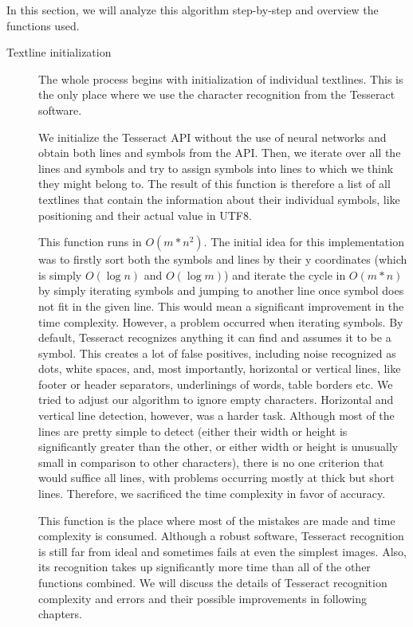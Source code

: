 In this section, we will analyze this algorithm step-by-step and overview the functions used.

\begin{description}
\item[Textline initialization] The whole process begins with initialization of individual textlines. This is the only place where we use the character recognition from the Tesseract software.

We initialize the Tesseract API without the use of neural networks and obtain both lines and symbols from the API. Then, we iterate over all the lines and symbols and try to assign symbols into lines to which we think they might belong to. The result of this function is therefore a list of all textlines that contain the information about their individual symbols, like positioning and their actual value in UTF8.

This function runs in $O(m*n^2)$. The initial idea for this implementation was to firstly sort both the symbols and lines by their y coordinates (which is simply $O(\log n)$ and  $O(\log m)$) and iterate the cycle in $O(m*n)$ by simply iterating symbols and jumping to another line once symbol does not fit in the given line. This would mean a significant improvement in the time complexity. However, a problem occurred when iterating symbols. By default, Tesseract recognizes anything it can find and assumes it to be a symbol. This creates a lot of false positives, including noise recognized as dots, white spaces, and, most importantly, horizontal or vertical lines, like footer or header separators, underlinings of words, table borders etc. We tried to adjust our algorithm to ignore empty characters. Horizontal and vertical line detection, however, was a harder task. Although most of the lines are pretty simple to detect (either their width or height is significantly greater than the other, or either width or height is unusually small in comparison to other characters), there is no one criterion that would suffice all lines, with problems occurring mostly at thick but short lines. Therefore, we sacrificed  the time complexity in favor of accuracy.

This function is the place where most of the mistakes are made and time complexity is consumed. Although a robust software, Tesseract recognition is still far from ideal and sometimes fails at even the simplest images. Also, its recognition takes up significantly more time than all of the other functions combined. We will discuss the details of Tesseract recognition complexity and errors and their possible improvements in following chapters.


\end{description}

